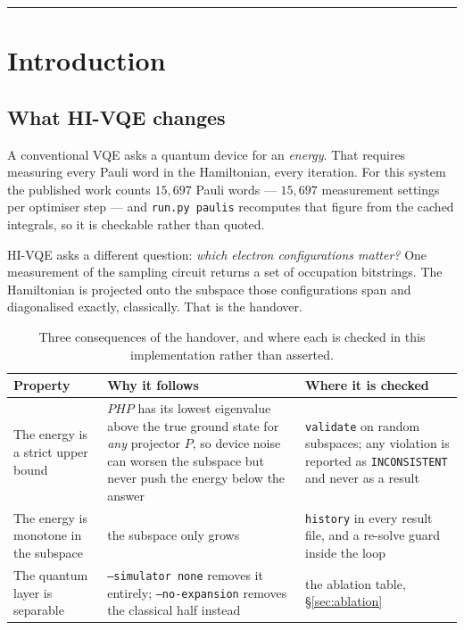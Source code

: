 \documentclass[11pt,a4paper]{article}
\newcommand{\code}[1]{\texttt{\small #1}}
\begin{document}
\tableofcontents
\vspace{0.6em}
\hrule
\vspace{0.8em}

\section{Introduction}

\subsection{What HI-VQE changes}

A conventional VQE asks a quantum device for an \emph{energy}. That requires
measuring every Pauli word in the Hamiltonian, every iteration. For this system
the published work counts $15{,}697$ Pauli words --- $15{,}697$ measurement
settings per optimiser step --- and \code{run.py paulis} recomputes that figure
from the cached integrals, so it is checkable rather than quoted.

HI-VQE asks a different question: \emph{which electron configurations matter?}
One measurement of the sampling circuit returns a set of occupation bitstrings.
The Hamiltonian is projected onto the subspace those configurations span and
diagonalised exactly, classically. That is the handover.

\begin{table}[htbp]
\centering
\caption{Three consequences of the handover, and where each is checked in this
implementation rather than asserted.}
\label{tab:consequences}
\small
\begin{tabular}{>{\raggedright\arraybackslash}p{}>{\raggedright\arraybackslash}p{}>{\raggedright\arraybackslash}p{}}
\toprule
Property & Why it follows & Where it is checked \\
\midrule
The energy is a strict upper bound &
$PHP$ has its lowest eigenvalue above the true ground state for \emph{any}
projector $P$, so device noise can worsen the subspace but never push the energy
below the answer &
\code{validate} on random subspaces; any violation is reported as
\code{INCONSISTENT} and never as a result \\
\addlinespace
The energy is monotone in the subspace &
the subspace only grows &
\code{history} in every result file, and a re-solve guard inside the loop \\
\addlinespace
The quantum layer is separable &
\code{--simulator none} removes it entirely; \code{--no-expansion} removes the
classical half instead &
the ablation table, \S\ref{sec:ablation} \\
\bottomrule
\end{tabular}
\end{table}
\end{document}

